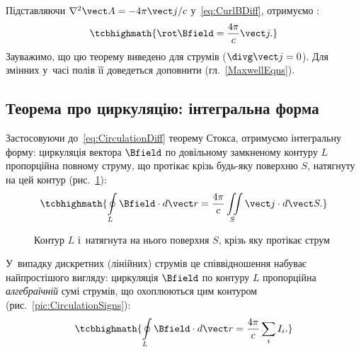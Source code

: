 Підставляючи $\nabla^2\vect A = -4\pi\vect j/c$ у~\eqref{eq:CurlBDiff}, отримуємо
:
\begin{equation}\label{eq:CirculationDiff}
	\tcbhighmath{
		\rot\Bfield = \frac{4\pi}c\vect j.
	}
\end{equation}
Зауважимо, що цю теорему виведено для  струмів ($\divg\vect j = 0$).
Для змінних у~часі полів її доведеться доповнити 
(гл.~\ref{MaxwellEqns}).


\subsection*{Теорема про циркуляцію: інтегральна форма}


Застосовуючи до~\eqref{eq:CirculationDiff} теорему Стокса, отримуємо інтегральну форму:
циркуляція вектора $\Bfield$ по довільному замкненому контуру $L$ пропорційна повному
струму, що протікає крізь будь-яку поверхню $S$, натягнуту на цей контур
(рис.~\ref{pic:CirculationLoop}):
\begin{equation*}
	\tcbhighmath{
		\oint\limits_L \Bfield\cdot d\vect r = \frac{4\pi}c \iint\limits_S \vect j\cdot d\vect S.
	}
\end{equation*}

\begin{figure}\centering
	\caption{Контур $L$ і~натягнута на нього поверхня $S$, крізь яку протікає
		струм\label{pic:CirculationLoop}}
\end{figure}

У~випадку дискретних (лінійних) струмів це співвідношення набуває найпростішого вигляду:
циркуляція $\Bfield$ по контуру $L$ пропорційна \emph{алгебраїчній} сумі струмів, що
охоплюються цим контуром (рис.~\ref{pic:CirculationSigns}):
\begin{equation}\label{eq:CirculationDiscrete}
	\tcbhighmath{
		\oint\limits_L \Bfield\cdot d\vect r = \frac{4\pi}c \sum\limits_i I_i.
	}
\end{equation}

